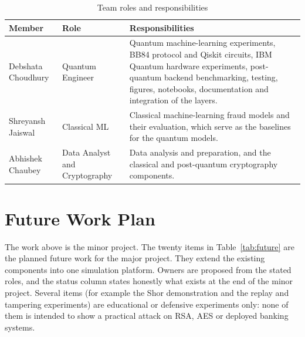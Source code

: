 \begin{table}[ht]
\centering\small
\caption{Team roles and responsibilities}
\label{tab:roles}
\begin{tabular}{@{}p{3.4cm}p{3.4cm}p{6.6cm}@{}}
\toprule
Member & Role & Responsibilities\\
\midrule
Debshata Choudhury & Quantum Engineer & Quantum machine-learning experiments, BB84 protocol and Qiskit circuits, IBM Quantum hardware experiments, post-quantum backend benchmarking, testing, figures, notebooks, documentation and integration of the layers.\\
Shreyansh Jaiswal & Classical ML & Classical machine-learning fraud models and their evaluation, which serve as the baselines for the quantum models.\\
Abhishek Chaubey & Data Analyst and Cryptography & Data analysis and preparation, and the classical and post-quantum cryptography components.\\
\bottomrule
\end{tabular}
\end{table}



\section{Future Work Plan}
The work above is the minor project. The twenty items in Table~\ref{tab:future} are the planned future work for the major project. They extend the existing components into one simulation platform. Owners are proposed from the stated roles, and the status column states honestly what exists at the end of the minor project. Several items (for example the Shor demonstration and the replay and tampering experiments) are educational or defensive experiments only: none of them is intended to show a practical attack on RSA, AES or deployed banking systems.


